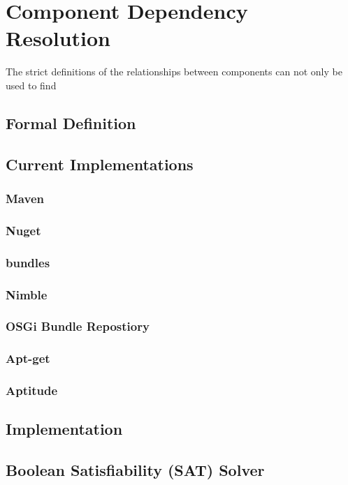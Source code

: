 \chapter{Component Dependency Resolution}
{}The strict definitions of the relationships between components can not only be used to find  

\section{Formal Definition}


\section{Current Implementations}
\subsection{Maven}

\subsection{Nuget} 

\subsection{bundles}

\subsection{Nimble}
\subsection{OSGi Bundle Repostiory}

\subsection{Apt-get}
\subsection{Aptitude}


\section{Implementation}

\section{Boolean Satisfiability (SAT) Solver}

